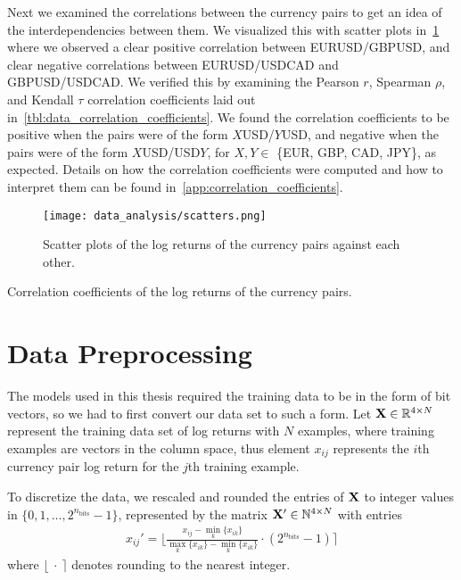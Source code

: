 Next we examined the correlations between the currency pairs to get an idea of the interdependencies between them.
We visualized this with scatter plots in~\cref{fig:scatters} where we observed a clear positive correlation between EURUSD/GBPUSD, and clear negative correlations between EURUSD/USDCAD and GBPUSD/USDCAD.
We verified this by examining the Pearson \( r \), Spearman \( \rho \), and Kendall \( \tau \) correlation coefficients laid out in~\cref{tbl:data_correlation_coefficients}.
We found the correlation coefficients to be positive when the pairs were of the form \( X \)USD/\( Y \)USD, and negative when the pairs were of the form \( X \)USD/USD\( Y \), for \( X,Y \in \) \{EUR, GBP, CAD, JPY\}, as expected.
Details on how the correlation coefficients were computed and how to interpret them can be found in~\cref{app:correlation_coefficients}.
\begin{figure}[!htb]
    \begin{center}
        \texttt{[image: data\_analysis/scatters.png]}
    \end{center}
    \caption{Scatter plots of the log returns of the currency pairs against each other.}
    \label{fig:scatters}
\end{figure}

\begin{table}[!htb]
    \centering
    \begin{adjustbox}{max width=\textwidth}
        
    \end{adjustbox}
    \caption{Correlation coefficients of the log returns of the currency pairs.}
    \label{tbl:data_correlation_coefficients}
\end{table}


\section{Data Preprocessing}
The models used in this thesis required the training data to be in the form of bit vectors, so we had to first convert our data set to such a form.
Let \( \mathbf{X} \in \mathbb{R}^{4 \times N} \) represent the training data set of log returns with \( N \) examples, where training examples are vectors in the column space, thus element \( x_{ij} \) represents the \( i \)th currency pair log return for the \( j \)th training example.

To discretize the data, we rescaled and rounded the entries of \( \mathbf{X} \) to integer values in \( \{0, 1, \dots, 2^{n_\text{bits}} - 1\} \), represented by the matrix \( \mathbf{X}' \in \mathbb{N}^{4 \times N} \) with entries
\begin{align}
    x_{ij}' = \bigg\lfloor \frac{x_{ij} - \min_k \{x_{ik}\}}{\max_k \{x_{ik}\} - \min_k \{x_{ik}\}} \cdot (2^{n_\text{bits}} - 1) \bigg\rceil
\end{align}
where \( \lfloor \ \cdot \ \rceil \) denotes rounding to the nearest integer.


